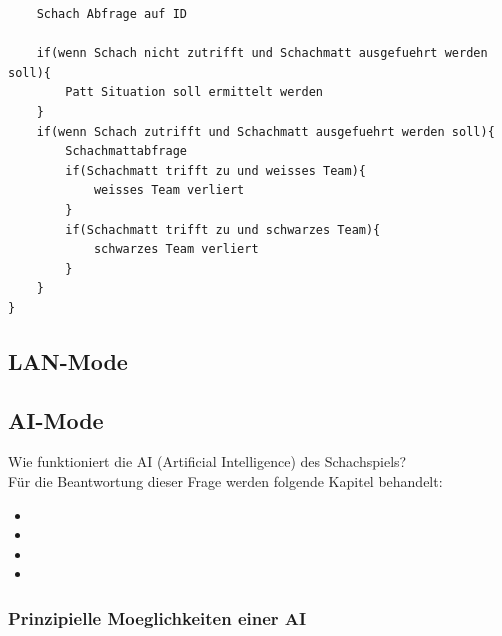 \documentclass[12pt,a4paper]{article}
\begin{document}
{\begin{lstlisting}
	Schach Abfrage auf ID
	
	if(wenn Schach nicht zutrifft und Schachmatt ausgefuehrt werden soll){
		Patt Situation soll ermittelt werden
	}
	if(wenn Schach zutrifft und Schachmatt ausgefuehrt werden soll){
		Schachmattabfrage
		if(Schachmatt trifft zu und weisses Team){
			weisses Team verliert
		}	
		if(Schachmatt trifft zu und schwarzes Team){
			schwarzes Team verliert
		}
	}
}
\end{lstlisting}

\subsection{LAN-Mode}


\subsection{AI-Mode}

Wie funktioniert die AI (Artificial Intelligence) des Schachspiels? \\
Für die Beantwortung dieser Frage werden folgende Kapitel behandelt:

\begin{itemize}
	\item{}
	\item{}
	\item{}
	\item{}
\end{itemize}



\subsubsection{Prinzipielle Moeglichkeiten einer AI}
\label{SUBSUBSEC:GenAI}

}
\end{document}
